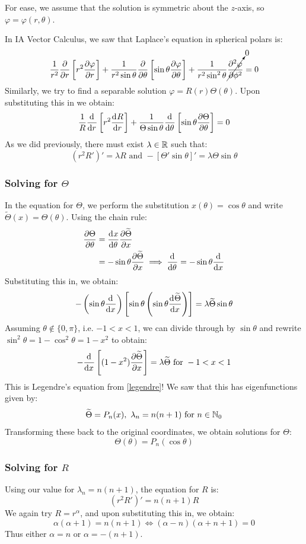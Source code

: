 \documentclass[../main.tex]{subfiles}
\begin{document}
For ease, we assume that the solution is symmetric about the $z$-axis, so $\varphi = \varphi(r, \theta)$.

In IA Vector Calculus, we saw that Laplace's equation in spherical polars is:
\[
  \frac{1}{r^2} \pderiv{}{r}\left[r^2 \pderiv{\varphi}{r}\right] + \frac{1}{r^2 \sin \theta} \pderiv{}{\theta}\left[\sin \theta \pderiv{\varphi}{\theta}\right] + \frac{1}{r^2 \sin^2 \theta} \cancelto{0}{\pderiv[2]{\varphi}{\phi}} =0
\]
Similarly, we try to find a separable solution $\varphi = R(r)\Theta(\theta)$.
Upon substituting this in we obtain:
\[
  \frac{1}{R} \deriv{}{r}\left[r^2 \deriv{R}{r}\right] + \frac{1}{\Theta \sin \theta} \deriv{}{\theta}\left[\sin \theta \pderiv{\Theta}{\theta}\right] = 0
\]
As we did previously, there must exist $\lambda \in \mathbb{R}$ such that:
\[
  (r^2 R')' = \lambda R \text{ and } -[\Theta' \sin \theta]' = \lambda \Theta \sin \theta
\]
\subsubsection{Solving for $\Theta$}
In the equation for $\Theta$, we perform the substitution $x(\theta) = \cos \theta$ and write $\widetilde{\Theta}(x) = \Theta(\theta)$.
Using the chain rule:
\begin{align*}
  \pderiv{\Theta}{\theta} &= \deriv{x}{\theta} \pderiv{\widetilde{\Theta}}{x} \\
                          &= - \sin \theta \pderiv{\widetilde{\Theta}}{x} \implies \deriv{}{\theta} = - \sin \theta \deriv{}{x}
\end{align*}
Substituting this in, we obtain:
\[
  -\left(\sin \theta \deriv{}{x}\right)\left[\sin \theta\left(\sin \theta \deriv{\widetilde{\Theta}}{x}\right)\right] = \lambda \widetilde{\Theta} \sin \theta
\]
Assuming $\theta \notin \{0, \pi\}$, i.e. $-1 < x < 1$, we can divide through by $\sin \theta$ and rewrite $\sin^2 \theta = 1 - \cos^2 \theta = 1 - x^2$ to obtain:
\[
  -\deriv{}{x}\left[(1 - x^2) \pderiv{\widetilde{\Theta}}{x}\right] = \lambda \widetilde{\Theta} \text{ for } -1 < x < 1
\]
This is Legendre's equation from \cref{legendre}!
We saw that this has eigenfunctions given by:
\[
  \widetilde{\Theta} = P_n(x),\ \lambda_n = n(n + 1) \text{ for $n \in \mathbb{N}_0$}
\]
Transforming these back to the original coordinates, we obtain solutions for $\Theta$:
\[
  \Theta(\theta) = P_n(\cos \theta)
\]
\subsubsection{Solving for $R$}
Using our value for $\lambda_{n} = n(n + 1)$, the equation for $R$ is:
\[
  (r^2 R')' = n(n + 1) R
\]
We again try $R = r^\alpha$, and upon substituting this in, we obtain:
\[
  \alpha(\alpha + 1) = n(n + 1) \iff (\alpha - n)(\alpha + n + 1) = 0
\]
Thus either $\alpha = n$ or $\alpha = -(n + 1)$.
\end{document}
